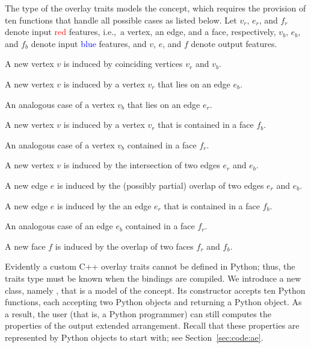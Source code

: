 The type of the overlay traits models the 
concept, which requires the provision of ten functions that handle all
possible cases as listed below. Let $v_r$, $e_r$, and $f_r$ denote
input \textcolor{red}{red} features, i.e.,~a vertex, an edge, and a
face, respectively, $v_b$, $e_b$, and $f_b$ denote input
\textcolor{blue}{blue} features, and $v$, $e$, and $f$ denote output
features.
\begin{compactenum}
\item A new vertex $v$ is induced by coinciding vertices $v_r$ and $v_b$.
\item A new vertex $v$ is induced by a vertex $v_r$ that lies on an edge $e_b$.
\item An analogous case of a vertex $v_b$ that lies on an edge $e_r$.
\item A new vertex $v$ is induced by a vertex $v_r$ that is contained in a
  face $f_b$.
\item An analogous case of a vertex $v_b$ contained in a face $f_r$.
\item A new vertex $v$ is induced by the intersection of two edges $e_r$ and
  $e_b$.
\item A new edge $e$ is induced by the (possibly partial) overlap of two edges $e_r$ and $e_b$.
\item A new edge $e$ is induced by the an edge $e_r$ that is contained in a
  face $f_b$.
\item An analogous case of an edge $e_b$ contained in a face $f_r$.
\item A new face $f$ is induced by the overlap of two faces $f_r$ and $f_b$.
\end{compactenum}
Evidently a custom C++ overlay traits cannot be defined in Python;
thus, the traits type must be known when the bindings are compiled. We
introduce a new class, namely ,
that is a model of the  concept. Its
constructor accepts ten Python functions, each accepting two Python
objects and returning a Python object. As a result, the user (that is,
a Python programmer) can still computes the properties of the output
extended arrangement. Recall that these properties are represented by
Python objects to start with; see Section~\ref{sec:code:ae}.


